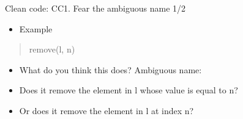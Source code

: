 \documentclass[
  8pt,
  ignorenonframetext,
]{beamer}
\newenvironment{Shaded}{\begin{snugshade}}{\end{snugshade}}
\newcommand{\NormalTok}[1]{#1}
\providecommand{\tightlist}{%
  \setlength{\itemsep}{0pt}\setlength{\parskip}{0pt}}
\begin{document}
\begin{frame}[fragile]{Clean code: CC1. Fear the ambiguous name 1/2}
\protect\hypertarget{clean-code-cc1.-fear-the-ambiguous-name-12}{}
\begin{itemize}[<+->]
\tightlist
\item
  Example
\end{itemize}

\begin{quote}
\begin{Shaded}
\begin{Highlighting}[]
\NormalTok{remove(l, n)}
\end{Highlighting}
\end{Shaded}
\end{quote}

\begin{itemize}[<+->]
\tightlist
\item
  What do you think this does? Ambiguous name:
\end{itemize}

\begin{itemize}[<+->]
\tightlist
\item
  Does it remove the element in l whose value is equal to n?
\item
  Or does it remove the element in l at index n?
\end{itemize}
\end{frame}
\end{document}
